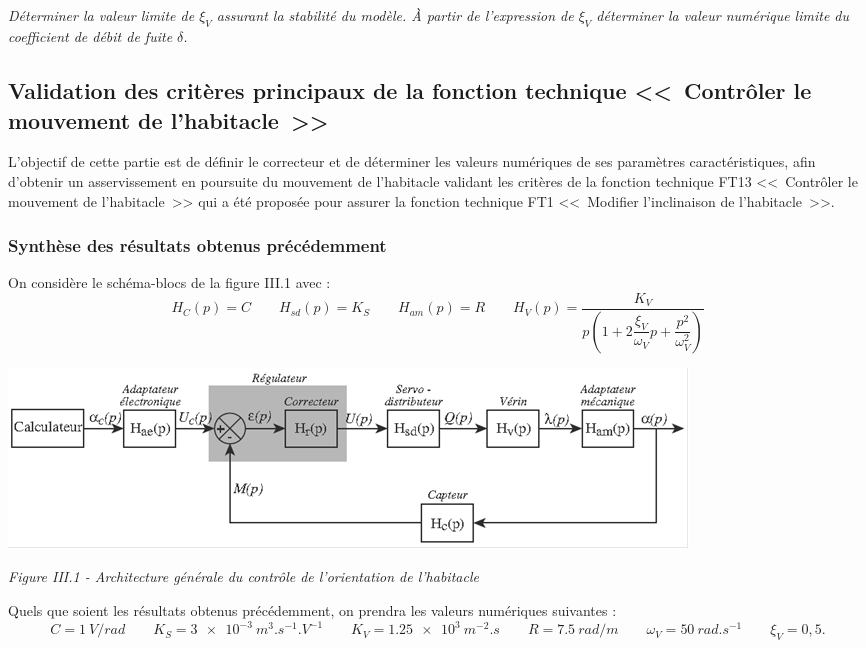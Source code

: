 \documentclass[10pt,fleqn]{article} %
\begin{document}
\begin{multicols}{2}
\subparagraph{}\textit{Déterminer la valeur limite de $\xi_V$ assurant la stabilité du modèle. À partir de l'expression de $\xi_V$ déterminer la valeur numérique limite du coefficient de débit de fuite $\delta$.}

\ifprof
\begin{corrige}
\end{corrige}
\else
\fi



\subsection*{Validation des critères principaux de la fonction technique <<~Contrôler le mouvement de l'habitacle~>> }

\begin{obj}
L'objectif de cette partie est de définir le correcteur et de déterminer les valeurs numériques de ses paramètres caractéristiques, afin d'obtenir un asservissement en poursuite du mouvement de l'habitacle validant les critères de la fonction technique FT13 <<~Contrôler le mouvement de l'habitacle~>> qui a été proposée pour assurer la fonction technique FT1 <<~Modifier l'inclinaison de l'habitacle~>>.
\end{obj}

\subsubsection*{Synthèse des résultats obtenus précédemment}


On considère le schéma-blocs de la figure III.1 avec :
$$
H_C(p)=C \quad \quad H_{sd}(p)=K_S \quad \quad H_{am}(p)=R \quad \quad  H_{V}(p)=\dfrac{K_V}{p\left(1+ 2\dfrac{\xi_V}{\omega_V}p + \dfrac{p^2}{\omega_V^2} \right)}
$$


\begin{center}
\includegraphics[width=.9\linewidth]{images/pt_06}

\textit{Figure III.1 - Architecture générale du contrôle de l'orientation de l'habitacle}
\end{center}

Quels que soient les résultats obtenus précédemment, on prendra les valeurs numériques suivantes :
$$C = \SI{1}{V/rad} \quad\quad K_S = \SI{3e-3}{m^3.s^{-1}.V^{-1}} \quad\quad  K_V = \SI{1,25e3}{m^{-2}.s}\quad\quad  R = \SI{7,5}{rad/m} \quad \quad  \omega_V=\SI{50}{rad.s^{-1}}    \quad \quad  \xi_V = 0,5.$$



\end{multicols}
\end{document}
